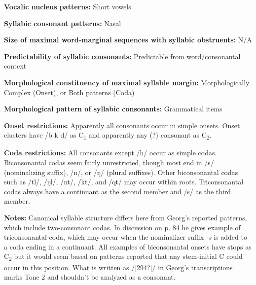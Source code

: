 \begin{styleBody}
\textbf{Vocalic nucleus patterns:} Short vowels
\end{styleBody}

\begin{styleBody}
\textbf{Syllabic consonant patterns:} Nasal
\end{styleBody}

\begin{styleBody}
\textbf{Size of maximal word{}-marginal sequences with syllabic obstruents:} N/A
\end{styleBody}

\begin{styleBody}
\textbf{Predictability of syllabic consonants:} Predictable from word/consonantal context
\end{styleBody}

\begin{styleBody}
\textbf{Morphological constituency of maximal syllable margin:} Morphologically Complex (Onset), or Both patterns (Coda)
\end{styleBody}

\begin{styleBody}
\textbf{Morphological pattern of syllabic consonants:} Grammatical items
\end{styleBody}

\begin{styleBody}
\textbf{Onset restrictions: }Apparently all consonants occur in simple onsets. Onset clusters have /b k d/ as C\textsubscript{1} and apparently any (?) consonant as C\textsubscript{2}.
\end{styleBody}

\begin{styleBody}
\textbf{Coda restrictions: }All consonants except /h/ occur as simple codas. Biconsonantal codas seem fairly unrestricted, though most end in /s/ (nominalizing suffix), /n/, or /ŋ/ (plural suffixes). Other biconsonantal codas such as /tl/, /ŋl/, /nt/, /kt/, and /qt/ may occur within roots. Triconsonantal codas always have a continuant as the second member and /s/ as the third member.
\end{styleBody}

\begin{styleBody}
\textbf{Notes: }Canonical syllable structure differs here from Georg’s reported patterns, which include two-consonant codas. In discussion on p. 84 he gives example of triconsonantal coda, which may occur when the nominalizer suffix \textit{{}-s} is added to a coda ending in a continuant. All examples of biconsonantal onsets have stops as C\textsubscript{2} but it would seem based on patterns reported that any stem-initial C could occur in this position. What is written as /[294?]/ in Georg’s transcriptions marks Tone 2 and shouldn’t be analyzed as a consonant.
\end{styleBody}

